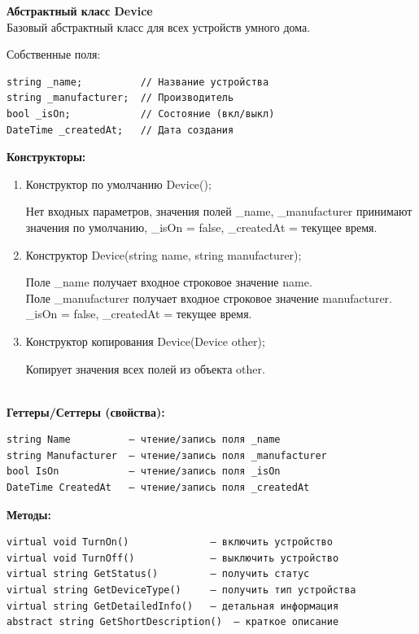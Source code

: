 \documentclass[oneside,a4paper,14pt]{extarticle}
\begin{document}
\textbf{Абстрактный класс Device}\\

Базовый абстрактный класс для всех устройств умного дома.

Собственные поля:

\begin{verbatim}
string _name;          // Название устройства
string _manufacturer;  // Производитель
bool _isOn;            // Состояние (вкл/выкл)
DateTime _createdAt;   // Дата создания
\end{verbatim}

\textbf{Конструкторы:}

\begin{enumerate}
    \item Конструктор по умолчанию Device();

Нет входных параметров, значения полей \_name, \_manufacturer принимают значения по умолчанию, \_isOn = false, \_createdAt = текущее время.

\item Конструктор Device(string name, string manufacturer);

Поле \_name получает входное строковое значение name.\\
Поле \_manufacturer получает входное строковое значение manufacturer.\\
\_isOn = false, \_createdAt = текущее время.

\item Конструктор копирования Device(Device other);

Копирует значения всех полей из объекта other.

\end{enumerate}\\

\textbf{Геттеры/Сеттеры (свойства):}

\begin{verbatim}
string Name          — чтение/запись поля _name
string Manufacturer  — чтение/запись поля _manufacturer
bool IsOn            — чтение/запись поля _isOn
DateTime CreatedAt   — чтение/запись поля _createdAt
\end{verbatim}

\textbf{Методы:}

\begin{verbatim}
virtual void TurnOn()              — включить устройство
virtual void TurnOff()             — выключить устройство
virtual string GetStatus()         — получить статус
virtual string GetDeviceType()     — получить тип устройства
virtual string GetDetailedInfo()   — детальная информация
abstract string GetShortDescription()  — краткое описание
\end{verbatim}
\end{document}
